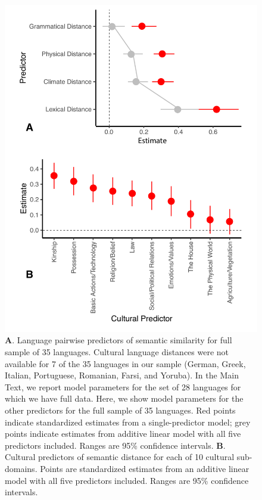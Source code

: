 \documentclass[9pt,twoside,lineno]{pnas-new}
\begin{document}
\begin{figure}[h]
\centering
     \includegraphics[width=4.5in]{suppfigs/distance_regressionsC.pdf}


 \caption{{\textbf A.} Language pairwise predictors of semantic similarity for full sample of 35 languages. Cultural language distances were not available for 7 of the 35 languages in our sample (German, Greek, Italian, Portuguese, Romanian, Farsi, and Yoruba). In the Main Text, we report model parameters for the set of 28 languages for which we have full data. Here, we show model parameters for the other predictors for the full sample of 35 languages.  Red points indicate standardized estimates from a single-predictor model; grey points indicate estimates from additive linear model with all five predictors included. Ranges are 95\% confidence intervals. {\textbf B.} Cultural predictors of semantic distance for each of 10 cultural sub-domains.  Points are standardized estimates from an additive linear model with all five predictors included. Ranges are 95\% confidence intervals.}
 
 \end{figure}



\pagebreak
 \clearpage
  
\end{document}
